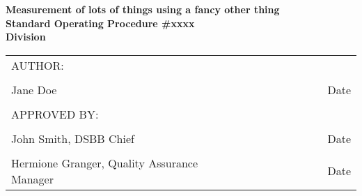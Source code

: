 \documentclass[12pt]{article}
\begin{document}
    \begin{titlepage}
    
        \begin{center}
            \textbf{Measurement of lots of things using a fancy other thing \\
            \vspace{0.25in}
            Standard Operating Procedure \#xxxx  \\ Division}
        \end{center}
        
        \vfill %
        \begin{table}[H]
        \centering
        \begin{tabular}{ l c }
        AUTHOR: &  \\ 
        \vspace{1.5cm} &  \\ 
        \hline
        Jane Doe & Date \\
        &  \\
        APPROVED BY: &  \\
        \vspace{1.5cm} &  \\
        \hline
        John Smith, DSBB Chief & Date \\
        \vspace{1.5cm} &  \\
        \hline
        Hermione Granger, Quality Assurance Manager~~~~~~~~~~~~~~~~~~~~~~~~~~~~~~~~~~~~~~~~ & Date
        \end{tabular}
        \end{table}
    
    \end{titlepage}
    
\end{document}
